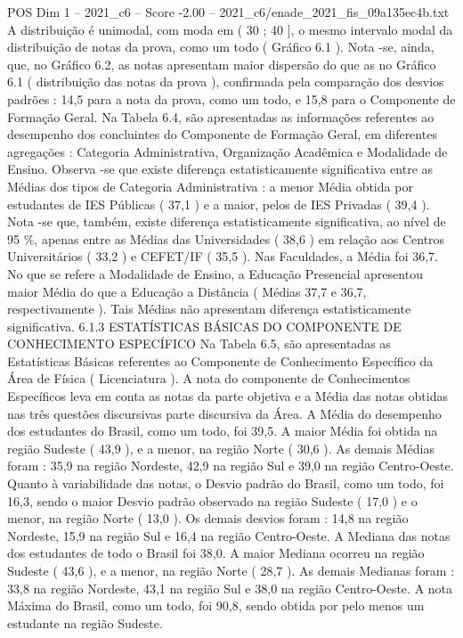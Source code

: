 \begin{textsample}{POS Dim 1 – 2021\_c6 – Score -2.00 – 2021\_c6/enade\_2021\_fis\_09a135ec4b.txt}
A distribuição é unimodal, com moda em ( 30 ; 40 ], o mesmo intervalo modal da distribuição de notas da prova, como um todo ( Gráfico 6.1 ).
Nota -se, ainda, que, no Gráfico 6.2, as notas apresentam maior dispersão do que as no Gráfico 6.1 ( distribuição das notas da prova ), confirmada pela comparação dos desvios padrões : 14,5 para a nota da prova, como um todo, e 15,8 para o Componente de Formação Geral.
Na Tabela 6.4, são apresentadas as informações referentes ao desempenho dos concluintes do Componente de Formação Geral, em diferentes agregações : Categoria Administrativa, Organização Acadêmica e Modalidade de Ensino.
Observa -se que existe diferença estatisticamente significativa entre as Médias dos tipos de Categoria Administrativa : a menor Média obtida por estudantes de IES Públicas ( 37,1 ) e a maior, pelos de IES Privadas ( 39,4 ).
Nota -se que, também, existe diferença estatisticamente significativa, ao nível de 95 \%, apenas entre as Médias das Universidades ( 38,6 ) em relação aos Centros Universitários ( 33,2 ) e CEFET/IF ( 35,5 ).
Nas Faculdades, a Média foi 36,7.
No que se refere a Modalidade de Ensino, a Educação Presencial apresentou maior Média do que a Educação a Distância ( Médias 37,7 e 36,7, respectivamente ).
Tais Médias não apresentam diferença estatisticamente significativa. 6.1.3 ESTATÍSTICAS BÁSICAS DO COMPONENTE DE CONHECIMENTO ESPECÍFICO Na Tabela 6.5, são apresentadas as Estatísticas Básicas referentes ao Componente de Conhecimento Específico da Área de Física ( Licenciatura ).
A nota do componente de Conhecimentos Específicos leva em conta as notas da parte objetiva e a Média das notas obtidas nas três questões discursivas parte discursiva da Área.
A Média do desempenho dos estudantes do Brasil, como um todo, foi 39,5.
A maior Média foi obtida na região Sudeste ( 43,9 ), e a menor, na região Norte ( 30,6 ).
As demais Médias foram : 35,9 na região Nordeste, 42,9 na região Sul e 39,0 na região Centro-Oeste.
Quanto à variabilidade das notas, o Desvio padrão do Brasil, como um todo, foi 16,3, sendo o maior Desvio padrão observado na região Sudeste ( 17,0 ) e o menor, na região Norte ( 13,0 ).
Os demais desvios foram : 14,8 na região Nordeste, 15,9 na região Sul e 16,4 na região Centro-Oeste.
A Mediana das notas dos estudantes de todo o Brasil foi 38,0.
A maior Mediana ocorreu na região Sudeste ( 43,6 ), e a menor, na região Norte ( 28,7 ).
As demais Medianas foram : 33,8 na região Nordeste, 43,1 na região Sul e 38,0 na região Centro-Oeste.
A nota Máxima do Brasil, como um todo, foi 90,8, sendo obtida por pelo menos um estudante na região Sudeste.

\end{textsample}
